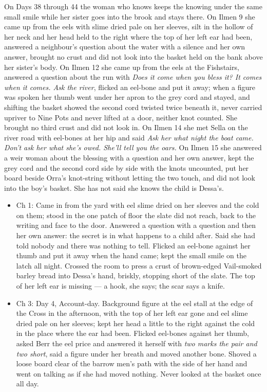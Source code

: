 \documentclass{design/chronicle}
\begin{document}
{On Days 38 through 44 the woman who knows keeps the knowing under the same small smile while her sister goes into the brook and stays there. On Ilmen 9 she came up from the eels with slime dried pale on her sleeves, silt in the hollow of her neck and her head held to the right where the top of her left ear had been, answered a neighbour’s question about the water with a silence and her own answer, brought no crust and did not look into the basket held on the bank above her sister’s body. On Ilmen 12 she came up from the eels at the Fishstairs, answered a question about the run with \emph{Does it come when you bless it? It comes when it comes. Ask the river}, flicked an eel-bone and put it away; when a figure was spoken her thumb went under her apron to the grey cord and stayed, and shifting the basket showed the second cord twisted twice beneath it, never carried upriver to Nine Pots and never lifted at a door, neither knot counted. She brought no third crust and did not look in. On Ilmen 14 she met Sella on the river road with eel-bones at her hip and said \emph{Ask her what night the boat came. Don’t ask her what she’s owed. She’ll tell you the oars.} On Ilmen 15 she answered a weir woman about the blessing with a question and her own answer, kept the grey cord and the second cord side by side with the knots uncounted, put her board beside Orra’s knot-string without letting the two touch, and did not look into the boy’s basket. She has not said she knows the child is Dessa’s.

\begin{itemize}[leftmargin=1.4em,itemsep=1pt,topsep=3pt,parsep=0pt]

\item Ch 1: Came in from the yard with eel slime dried on her sleeves and the cold on them; stood in the one patch of floor the slate did not reach, back to the writing and face to the door. Answered a question with a question and then her own answer: the secret is in what happens to a child after. Said she had told nobody and there was nothing to tell. Flicked an eel-bone against her thumb and put it away when the hand came; kept the small smile on the latch all night. Crossed the room to press a crust of brown-edged Vail-smoked barley bread into Dessa’s hand, briskly, stopping short of the slate. The top of her left ear is missing --- a hook, she says; the scar says a knife.

\item Ch 3: Day 4, Account-day. Background figure at the eel stall at the edge of the Cross in the afternoon, with the top of her left ear gone and eel slime dried pale on her sleeves; kept her head a little to the right against the cold in the place where the ear had been. Flicked eel-bones against her thumb, asked Berr the eel price and answered it herself with \emph{two marks the pair and two short}, said a figure under her breath and moved another bone. Shoved a loose board clear of the barrow men’s path with the side of her hand and went on talking as if she had moved nothing. Never looked at the basket once all day.


\end{itemize}}
\end{document}
